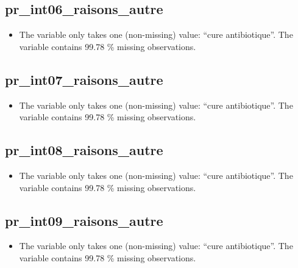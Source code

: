 \documentclass[
  letterpaper,
  DIV=11,
  numbers=noendperiod]{scrartcl}
\providecommand{\tightlist}{%
  \setlength{\itemsep}{0pt}\setlength{\parskip}{0pt}}
\begin{document}
\fullline

\subsection{pr\_int06\_raisons\_autre}\label{pr_int06_raisons_autre}

\begin{itemize}
\tightlist
\item
  The variable only takes one (non-missing) value: ``cure
  antibiotique''. The variable contains 99.78 \% missing observations.
\end{itemize}

\fullline

\subsection{pr\_int07\_raisons\_autre}\label{pr_int07_raisons_autre}

\begin{itemize}
\tightlist
\item
  The variable only takes one (non-missing) value: ``cure
  antibiotique''. The variable contains 99.78 \% missing observations.
\end{itemize}

\fullline

\subsection{pr\_int08\_raisons\_autre}\label{pr_int08_raisons_autre}

\begin{itemize}
\tightlist
\item
  The variable only takes one (non-missing) value: ``cure
  antibiotique''. The variable contains 99.78 \% missing observations.
\end{itemize}

\fullline

\subsection{pr\_int09\_raisons\_autre}\label{pr_int09_raisons_autre}

\begin{itemize}
\tightlist
\item
  The variable only takes one (non-missing) value: ``cure
  antibiotique''. The variable contains 99.78 \% missing observations.
\end{itemize}
\end{document}
